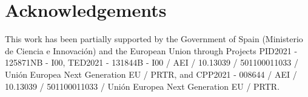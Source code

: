 \documentclass[12pt]{article}
\theoremstyle{definition}
\begin{document}
\newpage

\section*{Acknowledgements}
    This work has been partially supported by the Government of Spain (Ministerio de Ciencia e Innovaci\'on) and the European Union through Projects PID2021 - 125871NB - I00, TED2021 - 131844B - I00 / AEI / 10.13039 / 501100011033 / Uni\'on Europea Next Generation EU / PRTR, and CPP2021 - 008644 / AEI / 10.13039 / 501100011033 / Uni\'on Europea Next Generation EU / PRTR.



\end{document}
